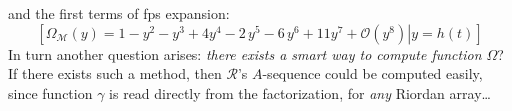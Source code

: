 and the first terms of fps expansion:
\begin{displaymath}
        \left.\left[
            \Omega_{\mathcal{M}}(y) = 1 -y^{2} -y^{3} + 4 y^{4} -2\,y^{5} 
                -6\,y^{6} + 11 y^{7}+\mathcal{O}\left(y^{8}\right)
                \right| y = h(t) \right]
\end{displaymath}
In turn another question arises: \emph{there
exists a smart way to compute function $\Omega$}? If there exists such a method, then
$\mathcal{R}$'s $A$-sequence could be computed easily, since function $\gamma$ 
is read directly from the factorization, for \emph{any} Riordan array\ldots
